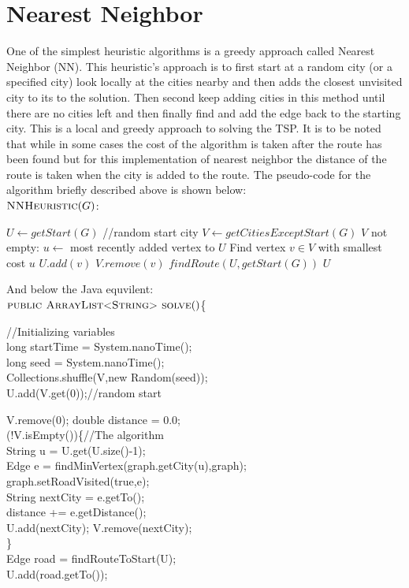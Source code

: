 \documentclass[midd]{thesis}
\newcommand{\tab}{\hspace*{2em}}
\begin{document}
\section{Nearest Neighbor}
\tab One of the simplest heuristic algorithms is a greedy approach called Nearest Neighbor (NN). This heuristic's approach is to first start at a random city (or a specified city) look locally at the cities nearby and then adds the closest unvisited city to its to the solution. Then second keep adding cities in this method until there are no cities left and then finally find and add the edge back to the starting city. This is a local and greedy approach to solving the TSP. It is to be noted that while in some cases the cost of the algorithm is taken after the route has been found but for this implementation of nearest neighbor the distance of the route is taken when the city is added to the route. The pseudo-code for the algorithm briefly described above is shown below:\\
$\textnormal{\scshape NNHeuristic}(G)$:
\begin{codebox}
\li $U \gets getStart(G)$ //random start city
\li $V \gets getCitiesExceptStart(G)$
\li\While $V$ not empty:
\li $u \gets$ most recently added vertex to $U$
\li Find vertex $v \in V$ with smallest cost $u$
\li $U.add(v)$
\li $V.remove(v)$\End
\li $findRoute(U, getStart(G))$
\li\Return $U$
\end{codebox}
And below the Java equvilent:\\
$\textnormal{\scshape public ArrayList$<$String$>$ solve}()$\{
\begin{codebox}
\tab//Initializing variables\\
\tab long startTime = System.nanoTime();\\
\tab long seed = System.nanoTime();\\
\tab Collections.shuffle(V,new Random(seed));\\
\tab U.add(V.get(0));//random start
\end{codebox}
\begin{codebox}
\tab V.remove(0); double distance = 0.0;\\
\tab\While(!V.isEmpty())\{//The algorithm\\
\tab\tab String u = U.get(U.size()-1);\\
\tab\tab Edge e = findMinVertex(graph.getCity(u),graph);\\
\tab\tab graph.setRoadVisited(true,e);\\
\tab\tab String nextCity = e.getTo();\\
\tab\tab distance += e.getDistance();\\
\tab\tab U.add(nextCity); V.remove(nextCity);\\
\tab\}\\\End
\tab Edge road = findRouteToStart(U);\\
\tab U.add(road.getTo());
\end{codebox}
\end{document}
